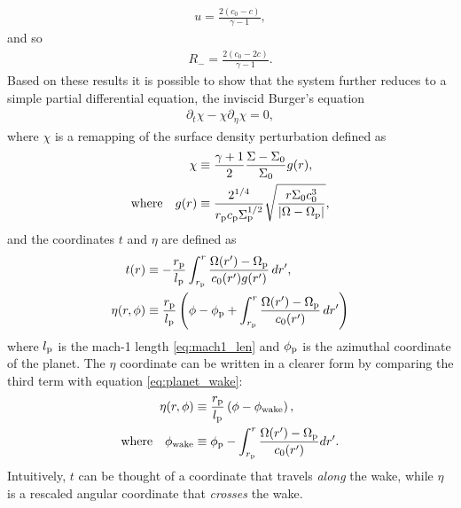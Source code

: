 \begin{align}
    u = \frac{2(c_0 - c)}{\gamma -1},
\end{align}
and so 
\begin{align}
    R_- = \frac{2(c_0 - 2c)}{\gamma -1}.
\end{align}
Based on these results it is possible to show that the system further reduces to a simple partial differential equation, the inviscid Burger's equation \citep[see appendix A of][]{rafikov2002a}
\begin{align}
    \partial_t \chi - \chi \partial_\eta \chi = 0, \label{eq:burgers}
\end{align}
where $\chi$ is a remapping of the surface density perturbation defined as 
\begin{align}
    \chi &\equiv \frac{\gamma +1}{2} \frac{\Sigma - \Sigma_0}{\Sigma_0} g(r), \label{eq:chi} \\
    {\rm where} \quad g(r) &\equiv \frac{2^{1/4}}{r_{\rm p} c_{\rm p} \Sigma_{\rm p}^{1/2}} \sqrt{\frac{r \Sigma_0 c_0^3}{|\Omega - \Omega_{\rm p}|}}, \label{eq:g}
\end{align}
and the coordinates $t$ and $\eta$ are defined as
\begin{align}
    t(r) &\equiv - \frac{r_{\rm p}}{l_{\rm p}} \int_{r_{\rm p}}^r \frac{\Omega(r') - \Omega_{\rm p}}{c_0(r') g(r')} \, dr', \label{eq:t} \\
    \eta(r,\phi) &\equiv \frac{r_{\rm p}}{l_{\rm p}} \left( \phi - \phi_{\rm p} + \int_{r_{\rm p}}^r \frac{\Omega(r') - \Omega_{\rm p}}{c_0(r')} \, dr'  \right) \label{eq:eta}
\end{align}
where $l_{\rm p}$ is the mach-1 length \ref{eq:mach1_len} and $\phi_{\rm p}$ is the azimuthal coordinate of the planet.
The $\eta$ coordinate can be written in a clearer form by comparing the third term with equation \ref{eq:planet_wake}:
\begin{align}
    \eta(r,\phi) &\equiv \frac{r_{\rm p}}{l_{\rm p}} \left( \phi - \phi_{\rm wake} \right), \\
    \rm{where} \quad \phi_{\rm wake} &\equiv \phi_{\rm p} - \int_{r_{\rm p}}^r \frac{\Omega(r') - \Omega_{\rm p}}{c_0(r')} dr'. \label{eq:phi_wake}
\end{align}
Intuitively, $t$ can be thought of a coordinate that travels \textit{along} the wake, while $\eta$ is a rescaled angular coordinate that \textit{crosses} the wake.

